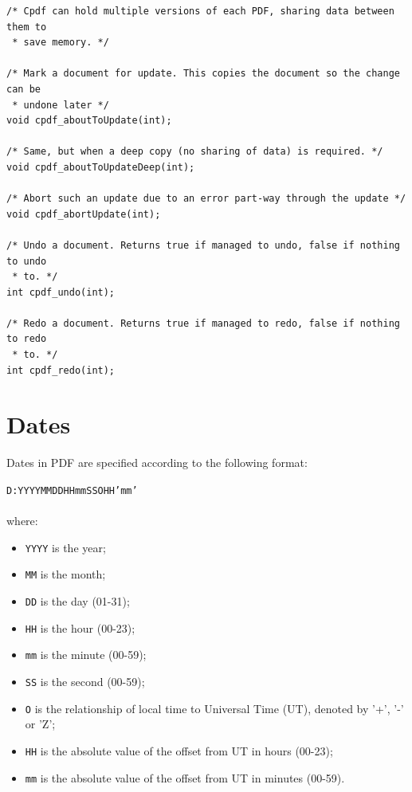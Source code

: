 \documentclass[a4paper]{memoir}
\begin{document}
\begin{small}
\begin{lstlisting}
/* Cpdf can hold multiple versions of each PDF, sharing data between them to
 * save memory. */

/* Mark a document for update. This copies the document so the change can be
 * undone later */
void cpdf_aboutToUpdate(int);

/* Same, but when a deep copy (no sharing of data) is required. */
void cpdf_aboutToUpdateDeep(int);

/* Abort such an update due to an error part-way through the update */
void cpdf_abortUpdate(int);

/* Undo a document. Returns true if managed to undo, false if nothing to undo
 * to. */
int cpdf_undo(int);

/* Redo a document. Returns true if managed to redo, false if nothing to redo
 * to. */
int cpdf_redo(int);
\end{lstlisting}
\end{small}

\appendix
\chapter{Dates}
\label{dates}
Dates in PDF are specified according to the following format:

\begin{framed}
\texttt{D:YYYYMMDDHHmmSSOHH'mm'}\\\\where:

\begin{itemize}
  \item \texttt{YYYY} is the year;
  \item \texttt{MM} is the month;
  \item \texttt{DD} is the day (01-31);
  \item \texttt{HH} is the hour (00-23);
  \item \texttt{mm} is the minute (00-59);
  \item \texttt{SS} is the second (00-59);
  \item \texttt{O} is the relationship of local time to Universal Time (UT), denoted by '+', '-' or 'Z';
  \item \texttt{HH} is the absolute value of the offset from UT in hours (00-23);
  \item \texttt{mm} is the absolute value of the offset from UT in minutes (00-59).
\end{itemize}
\end{framed}
\end{document}
